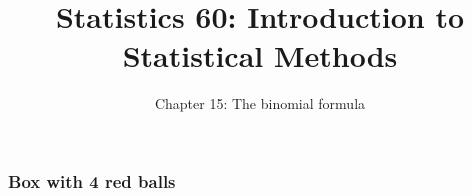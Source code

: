 \documentclass[handout]{beamer}
\title{Statistics 60: Introduction to Statistical Methods}
\subtitle{Chapter 15: The binomial formula}
\author{}%
\begin{document}
   \begin{frame}
   \titlepage
   \end{frame}



   \begin{frame}
   \frametitle{Box with 4 red balls}
   \begin{center}
   \end{center}

   \end{frame}

\end{document}
